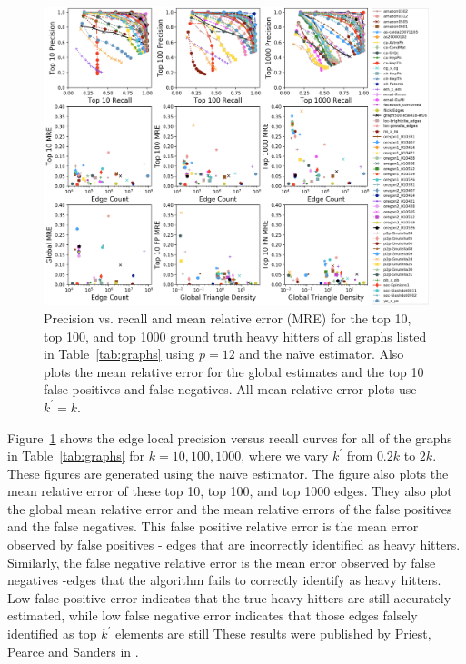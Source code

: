 \documentclass[10]{article}
\begin{document}
\begin{figure}
	\centerline{\includegraphics[width=1.0\columnwidth]{graph_challenge_plot}}
	\caption{Precision vs. recall and mean relative error (MRE) for the top 10, top 100, and top 1000 ground truth heavy hitters of all graphs listed in Table~\ref{tab:graphs} using $p=12$ and the na\"ive estimator.
	Also plots the mean relative error for the global estimates and the top 10 false positives and false negatives.
	All mean relative error plots use $k^\prime = k$.
	\label{fig:graph_challenge}}
\end{figure}

Figure~\ref{fig:graph_challenge} shows the edge local precision versus recall curves for all of the graphs in Table~\ref{tab:graphs} for $k = 10, 100, 1000$, where we vary $k^\prime$ from $0.2k$ to $2k$. 
These figures are generated using the na\"ive estimator.
The figure also plots the mean relative error of these top 10, top 100, and top 1000 edges.
They also plot the global mean relative error and the mean relative errors of the false positives and the false negatives.
This false positive relative error is the mean error observed by false positives - edges that are incorrectly identified as heavy hitters.
Similarly, the false negative relative error is the mean error observed by false negatives -edges that the algorithm fails to correctly identify as heavy hitters. 
Low false positive error indicates that the true heavy hitters are still accurately estimated, while low false negative error indicates that those edges falsely identified as top $k^\prime$ elements are still
These results were published by Priest, Pearce and Sanders in \cite{priest2018estimating}.
\end{document}
